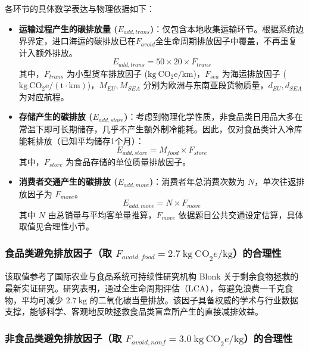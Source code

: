 \documentclass{article}
\begin{document}
各环节的具体数学表达与物理依据如下：
\begin{itemize}
    \item \textbf{运输过程产生的碳排放量 ($E_{add, trans}$)}：仅包含本地收集运输环节。根据系统边界界定，进口海运的碳排放已在$F_{avoid}$全生命周期排放因子中覆盖，不再重复计入额外排放。
    \begin{equation}
        E_{add, trans} = 50 \times 20 \times F_{trans} 
    \end{equation}
    其中，$F_{trans}$ 为小型货车排放因子 ($\mathrm{kg\ CO_2e/km}$)，$F_{sea}$ 为海运排放因子 ($\mathrm{kg\ CO_2e/(t\cdot km)}$)，$M_{EU}, M_{SEA}$ 分别为欧洲与东南亚段货物质量，$d_{EU}, d_{SEA}$ 为对应航程。%
    
    \item \textbf{存储产生的碳排放 ($E_{add, store}$)}：考虑到物理化学性质，非食品类日用品大多在常温下即可长期储存，几乎不产生额外制冷能耗。因此，仅对食品类计入冷库能耗排放（已知平均储存1个月）：
    \begin{equation}
        E_{add, store} = M_{food} \times F_{store}
    \end{equation}
    其中，$F_{store}$ 为食品存储的单位质量排放因子。
    
    \item \textbf{消费者交通产生的碳排放 ($E_{add, move}$)}：消费者年总消费次数为 $N$，单次往返排放因子为 $F_{move}$。
    \begin{equation}
        E_{add, move} = N \times F_{move}
    \end{equation}
    其中 $N$ 由总销量与平均客单量推算，$F_{move}$ 依据题目公共交通设定估算，具体取值见合理性小节。
\end{itemize}



\subsubsection{食品类避免排放因子（取 $F_{avoid, food} = 2.7\ \mathrm{kg\ CO}_2e/\mathrm{kg}$）的合理性}

该取值参考了国际农业与食品系统可持续性研究机构 Blonk 关于剩余食物拯救的最新实证研究。研究表明，通过全生命周期评估（LCA），每避免浪费一千克食物，平均可减少 $2.7\ \mathrm{kg}$ 的二氧化碳当量排放。该因子具备权威的学术与行业数据支撑，能够科学、客观地反映拯救食品类盲盒所产生的直接减排效益。

\subsubsection{非食品类避免排放因子（取 $F_{avoid, nonf} = 3.0\ \mathrm{kg\ CO}_2e/\mathrm{kg}$）的合理性}
\end{document}
